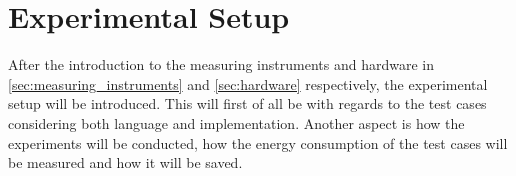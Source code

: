 \section{Experimental Setup}\label{sec:experimental_setup}

After the introduction to the measuring instruments and hardware in \cref{sec:measuring_instruments} and \cref{sec:hardware} respectively, the experimental setup will be introduced. This will first of all be with regards to the test cases considering both language and implementation. Another aspect is how the experiments will be conducted, how the energy consumption of the test cases will be measured and how it will be saved. 





